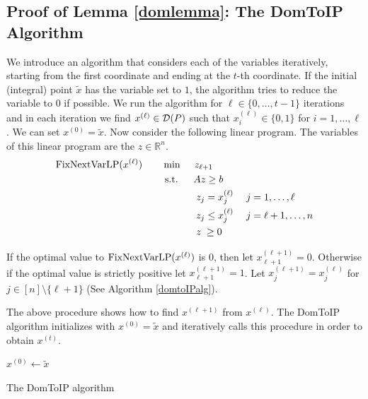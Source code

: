 \subsection{Proof of Lemma \ref{domlemma}: The DomToIP Algorithm}

We introduce an algorithm that considers each of the variables iteratively, starting from the first coordinate and ending at the $t$-th coordinate. If the initial (integral) point $\tilde{x}$ has the variable set to $1$, the algorithm tries to reduce the variable to $0$ if possible. We run the algorithm for $\ell\in \{0,\ldots,t-1\}$ iterations and in each iteration we find $x^{(\ell)}\in \operatorname{\mathcal{D}}(P)$  such that $x^{(\ell)}_i\in \{0,1\}$ for $i=1,\ldots,\ell$.
We can set $x^{(0)}=\tilde{x}$. Now consider the following linear program. The variables of this linear program are the $z\in \mathbb{R}^n$.
\begin{align}
\HelperLP(x^{(\ell)})\quad\quad& \min\quad \;z_{\ell+1}\\
&\;\text{s.t.} \quad \;\;Az\geq b \\
&\;{\color{white}{\text{s.t.}} }\quad \;\; \; z_j = x^{(\ell)}_j \quad \; j =1,\ldots, \ell\\
&\;{\color{white}{\text{s.t.}} }\quad \; \;\; z_j \leq x^{(\ell)}_j \quad \; j = \ell+1,\ldots,n\\
&\;{\color{white}{\text{s.t.}} }\quad \; \;\; z\;\geq 0
\end{align}

If the optimal value to $\operatorname{{{FixNextVarLP}}}(x^{(\ell)})$ is 0, then let $x^{(\ell+1)}_{\ell+1} = 0$. Otherwise if the optimal value is strictly positive let $x^{(\ell+1)}_{\ell+1} = 1$. Let $x^{(\ell+1)}_j = x^{(\ell)}_j$ for $j\in [n]\setminus \{\ell+1\}$ (See Algorithm \ref{domtoIPalg}).

The above procedure shows how to find $x^{(\ell+1)}$ from $x^{(\ell)}$. The DomToIP algorithm initializes with $x^{(0)}=\tilde{x}$ and  iteratively calls this procedure in order to obtain $x^{(t)}$. 

\vspace*{10pt}
\begin{algorithm}[h]
	$x^{(0)}\leftarrow \tilde{x}$\\
	\caption{The DomToIP algorithm}
	\label{domtoIPalg}
\end{algorithm}
\vspace*{10pt}

